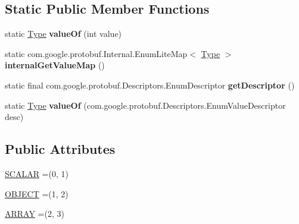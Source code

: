 \subsection*{Static Public Member Functions}
\begin{DoxyCompactItemize}
\item 
\mbox{\label{enumcom_1_1mysql_1_1cj_1_1x_1_1protobuf_1_1_mysqlx_datatypes_1_1_any_1_1_type_acc62fa8a15e399685d96bfb9759e9633}} 
static \mbox{\hyperlink{enumcom_1_1mysql_1_1cj_1_1x_1_1protobuf_1_1_mysqlx_datatypes_1_1_any_1_1_type}{Type}} {\bfseries value\+Of} (int value)
\item 
\mbox{\label{enumcom_1_1mysql_1_1cj_1_1x_1_1protobuf_1_1_mysqlx_datatypes_1_1_any_1_1_type_a026d66579a9eb140205a790cafc0a4f5}} 
static com.\+google.\+protobuf.\+Internal.\+Enum\+Lite\+Map$<$ \mbox{\hyperlink{enumcom_1_1mysql_1_1cj_1_1x_1_1protobuf_1_1_mysqlx_datatypes_1_1_any_1_1_type}{Type}} $>$ {\bfseries internal\+Get\+Value\+Map} ()
\item 
\mbox{\label{enumcom_1_1mysql_1_1cj_1_1x_1_1protobuf_1_1_mysqlx_datatypes_1_1_any_1_1_type_ad5ae1f277b88664ebdb0be538768b8ae}} 
static final com.\+google.\+protobuf.\+Descriptors.\+Enum\+Descriptor {\bfseries get\+Descriptor} ()
\item 
\mbox{\label{enumcom_1_1mysql_1_1cj_1_1x_1_1protobuf_1_1_mysqlx_datatypes_1_1_any_1_1_type_a288a29f508a20f1571fe281dbf8ae5a6}} 
static \mbox{\hyperlink{enumcom_1_1mysql_1_1cj_1_1x_1_1protobuf_1_1_mysqlx_datatypes_1_1_any_1_1_type}{Type}} {\bfseries value\+Of} (com.\+google.\+protobuf.\+Descriptors.\+Enum\+Value\+Descriptor desc)
\end{DoxyCompactItemize}
\subsection*{Public Attributes}
\begin{DoxyCompactItemize}
\item 
\mbox{\hyperlink{enumcom_1_1mysql_1_1cj_1_1x_1_1protobuf_1_1_mysqlx_datatypes_1_1_any_1_1_type_a14ad5260f4cc5fab9e5ea942d25f758d}{S\+C\+A\+L\+AR}} =(0, 1)
\item 
\mbox{\hyperlink{enumcom_1_1mysql_1_1cj_1_1x_1_1protobuf_1_1_mysqlx_datatypes_1_1_any_1_1_type_a8775d33409fc8c3f0d6ac1fdf9d59bb9}{O\+B\+J\+E\+CT}} =(1, 2)
\item 
\mbox{\hyperlink{enumcom_1_1mysql_1_1cj_1_1x_1_1protobuf_1_1_mysqlx_datatypes_1_1_any_1_1_type_ab2305401fad8b75a43c56a6f3c62c2b6}{A\+R\+R\+AY}} =(2, 3)
\end{DoxyCompactItemize}
